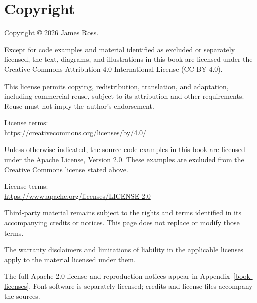 \chapter*{Copyright}
\label{book-copyright}
\thispagestyle{empty}

Copyright © 2026 James Ross.

Except for code examples and material identified as excluded or separately licensed, the text, diagrams, and illustrations in this book are licensed under the Creative Commons Attribution 4.0 International License (CC BY 4.0).

This license permits copying, redistribution, translation, and adaptation, including commercial reuse, subject to its attribution and other requirements. Reuse must not imply the author’s endorsement.

License terms:\\
\url{https://creativecommons.org/licenses/by/4.0/}

Unless otherwise indicated, the source code examples in this book are licensed under the Apache License, Version 2.0. These examples are excluded from the Creative Commons license stated above.

License terms:\\
\url{https://www.apache.org/licenses/LICENSE-2.0}

Third-party material remains subject to the rights and terms identified in its accompanying credits or notices. This page does not replace or modify those terms.

The warranty disclaimers and limitations of liability in the applicable licenses apply to the material licensed under them.

\medskip
{\small The full Apache 2.0 license and reproduction notices appear in Appendix~\ref{book-licenses}. Font software is separately licensed; credits and license files accompany the sources.}
